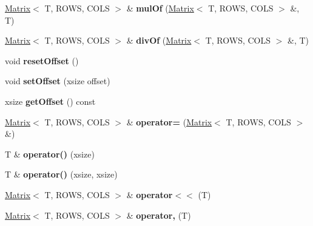 \begin{DoxyCompactItemize}
\item 
\hypertarget{class_x_1_1_matrix_a1ca2d2fc417228449b500e583c89c194}{\hyperlink{class_x_1_1_matrix}{Matrix}$<$ T, R\-O\-W\-S, C\-O\-L\-S $>$ \& {\bfseries mul\-Of} (\hyperlink{class_x_1_1_matrix}{Matrix}$<$ T, R\-O\-W\-S, C\-O\-L\-S $>$ \&, T)}\label{class_x_1_1_matrix_a1ca2d2fc417228449b500e583c89c194}

\item 
\hypertarget{class_x_1_1_matrix_a3827f511425bccd9d6fcdfffea305380}{\hyperlink{class_x_1_1_matrix}{Matrix}$<$ T, R\-O\-W\-S, C\-O\-L\-S $>$ \& {\bfseries div\-Of} (\hyperlink{class_x_1_1_matrix}{Matrix}$<$ T, R\-O\-W\-S, C\-O\-L\-S $>$ \&, T)}\label{class_x_1_1_matrix_a3827f511425bccd9d6fcdfffea305380}

\item 
\hypertarget{class_x_1_1_matrix_ac2a654d2319a0be6386c380662972c1a}{void {\bfseries reset\-Offset} ()}\label{class_x_1_1_matrix_ac2a654d2319a0be6386c380662972c1a}

\item 
\hypertarget{class_x_1_1_matrix_ad98787fc46e620922f8f663cd311a4f5}{void {\bfseries set\-Offset} (xsize offset)}\label{class_x_1_1_matrix_ad98787fc46e620922f8f663cd311a4f5}

\item 
\hypertarget{class_x_1_1_matrix_abf02b1c525d47e389dcb14679f51c84f}{xsize {\bfseries get\-Offset} () const }\label{class_x_1_1_matrix_abf02b1c525d47e389dcb14679f51c84f}

\item 
\hypertarget{class_x_1_1_matrix_a869186f779e32a8324c439307215d2c9}{\hyperlink{class_x_1_1_matrix}{Matrix}$<$ T, R\-O\-W\-S, C\-O\-L\-S $>$ \& {\bfseries operator=} (\hyperlink{class_x_1_1_matrix}{Matrix}$<$ T, R\-O\-W\-S, C\-O\-L\-S $>$ \&)}\label{class_x_1_1_matrix_a869186f779e32a8324c439307215d2c9}

\item 
\hypertarget{class_x_1_1_matrix_ad2953fafd8758c9c3c79e5c7607aad37}{T \& {\bfseries operator()} (xsize)}\label{class_x_1_1_matrix_ad2953fafd8758c9c3c79e5c7607aad37}

\item 
\hypertarget{class_x_1_1_matrix_a1048d1369ba7ae4d4e0dec4200523ee4}{T \& {\bfseries operator()} (xsize, xsize)}\label{class_x_1_1_matrix_a1048d1369ba7ae4d4e0dec4200523ee4}

\item 
\hypertarget{class_x_1_1_matrix_aab9d681351a2873e830d3cf0226a256b}{\hyperlink{class_x_1_1_matrix}{Matrix}$<$ T, R\-O\-W\-S, C\-O\-L\-S $>$ \& {\bfseries operator$<$$<$} (T)}\label{class_x_1_1_matrix_aab9d681351a2873e830d3cf0226a256b}

\item 
\hypertarget{class_x_1_1_matrix_ae91830bdce6c3c7cd5433be007765700}{\hyperlink{class_x_1_1_matrix}{Matrix}$<$ T, R\-O\-W\-S, C\-O\-L\-S $>$ \& {\bfseries operator,} (T)}\label{class_x_1_1_matrix_ae91830bdce6c3c7cd5433be007765700}

\end{DoxyCompactItemize}
